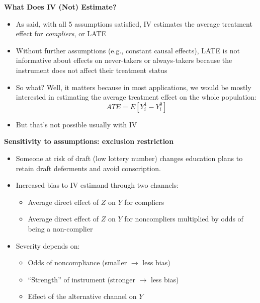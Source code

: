 \documentclass[notes=show]{beamer}
\begin{document}
\begin{frame}[plain]

	\begin{center}
	\textbf{What Does IV (Not) Estimate?}
	\end{center}
	
	\begin{itemize}
	\item As said, with all 5 assumptions satisfied, IV estimates the average treatment effect for \emph{compliers}, or LATE
	\item Without further assumptions (e.g., constant causal effects), LATE is not informative about effects on never-takers or always-takers because the instrument does not affect their treatment status
	\item So what?  Well, it matters because in most applications, we would be mostly interested in estimating the average treatment effect on the whole population:$$ATE = E[Y^1_i - Y^0_i]$$
	\item But that's not possible usually with IV
	\end{itemize}

\end{frame}

		
\begin{frame}[plain]

	\begin{center}
	\textbf{Sensitivity to assumptions: exclusion restriction}
	\end{center}
	
\begin{itemize}
	
\item Someone at risk of draft (low lottery number) changes education plans to retain draft deferments and avoid conscription. 

\item Increased bias to IV estimand through two channels:
		\begin{itemize}
		\item Average direct effect of $Z$ on $Y$ for compliers
		\item Average direct effect of $Z$ on $Y$ for noncompliers multiplied by odds of being a non-complier
		\end{itemize}

\item Severity depends on: 
		\begin{itemize}
		\item Odds of noncompliance (smaller $\rightarrow$ less bias)
		\item ``Strength'' of instrument (stronger $\rightarrow$ less bias)
		\item Effect of the alternative channel on $Y$
		\end{itemize}
\end{itemize}

\end{frame}
\end{document}
